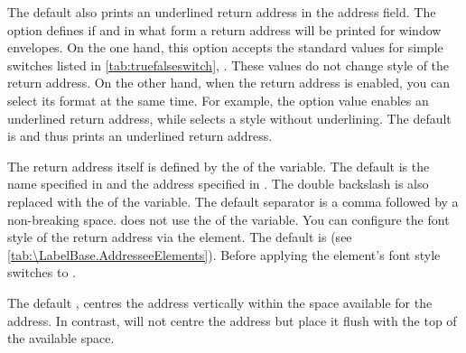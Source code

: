 The default  also prints an underlined return
address in the address field. The  option defines if and
in what form a return address will be printed for window envelopes. On the one
hand, this option accepts the
standard values for simple switches listed in \autoref{tab:truefalseswitch},
. These values do not change style of the
return address. On the other hand, when the
return address is enabled, you can select its format at the same time. For
example, the  option value enables an underlined return
address, while 
selects a style without underlining. The default is  and
thus prints an underlined return address.

The return address itself is defined by the  of the
 variable. The default is the name specified in
 and the address specified in
. The double backslash is also
replaced with the  of the 
variable. The default separator is a comma followed by a non-breaking space.
\KOMAScript{} does not use the  of the
 variable.
\BeginIndexGroup{}%
%
You can configure the font style of the return address via the
 element. The
default is %
 (see
\autoref{tab:\LabelBase.AddresseeElements}).  Before applying the element's
font style \KOMAScript{} switches to .%
\EndIndexGroup

The default , centres the address vertically
within the space available for the address.
In contrast,
%
 will not centre the address
but place it flush with the top of the available space.%

